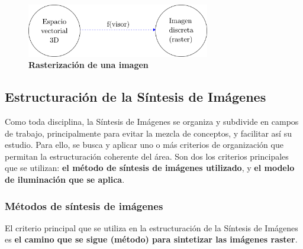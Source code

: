 \begin{figure}[h]
\includegraphics[width=8cm]{Img/CPD/grafica3.png}
\centering
\caption{\textbf{\footnotesize{Rasterización de una imagen}}}
\label{fig:grafica3}
\end{figure}

\subsection{Estructuración de la Síntesis de Imágenes}
Como toda disciplina, la Síntesis de Imágenes se organiza y subdivide en campos de trabajo, principalmente para evitar la mezcla de conceptos, y facilitar así su estudio. Para ello, se busca y aplicar uno o más criterios de organización que permitan la estructuración coherente del área. Son dos los criterios principales que se utilizan: \textbf{el método de síntesis de imágenes utilizado}, y \textbf{el modelo de iluminación que se aplica}.



\subsubsection{Métodos de síntesis de imágenes}
El criterio principal que se utiliza en la estructuración de la Síntesis de Imágenes es \textbf{el camino que se sigue (método) para sintetizar las imágenes raster}.

